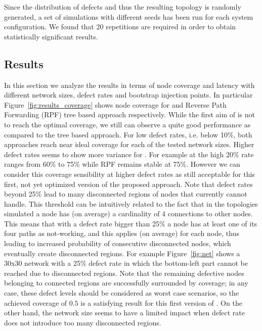 Since the distribution of defects and thus the resulting topology is randomly
generated, a set of simulations with different seeds has been run
for each system configuration. We found that 20 repetitions are
required in order to obtain statistically significant results.


\subsection{Results}
\label{sec:results}

In this section we analyze the results in terms of node coverage and
latency with different network sizes, defect rates and bootstrap
injection points. In particular Figure~\ref{fig:results_coverage}
shows node coverage for \disr{} and Reverse Path Forwarding (RPF) tree
based approach respectively. While the first aim of \disr{} is not to
reach the optimal coverage, we still can observe a quite good
performance as compared to the tree based approach. For low defect
rates, i.e. below 10\%, both approaches reach near ideal coverage for
each of the tested network sizes. Higher defect rates seems to show
more variance for \disr{}. For example at the high 20\% rate \disr{}
ranges from 60\% to 75\% while RPF remains stable at 75\%. However we
can consider this coverage sensibility at higher defect rates as still acceptable
for this first, not yet optimized version of the proposed approach.
Note that defect rates beyond 25\% lead to many disconnected
regions of nodes that \disr{} currently cannot handle. This threshold can be
intuitively related to the fact that in the topologies simulated a
node has (on average) a cardinality of 4 connections to other nodes. This means
that with a defect rate bigger than 25\% a node has at least one of its four
paths as not-working, and this applies (on average) for each node,
thus leading to increased probability of consecutive disconnected
nodes, which eventually create disconnected regions. For example Figure~\ref{fig:net} shows a 30x30 network with a 25\%
defect rate in which the bottom-left part cannot be reached due to
disconnected regions. Note that the remaining defective nodes belonging to
connected regions are successfully surrounded by \disr{} coverage; in any
case, these defect levels should be considered as worst case scenarios, so the
achieved coverage of $0.5$ is a satisfying result for this first
version of \disr{}. On the other hand, the network size seems to have a
limited impact when defect rate does not introduce too many disconnected
regions. 
